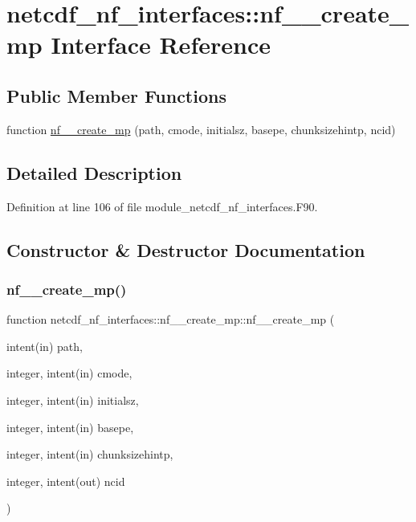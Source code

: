 \hypertarget{interfacenetcdf__nf__interfaces_1_1nf____create__mp}{}\section{netcdf\+\_\+nf\+\_\+interfaces\+:\+:nf\+\_\+\+\_\+create\+\_\+mp Interface Reference}
\label{interfacenetcdf__nf__interfaces_1_1nf____create__mp}
\subsection*{Public Member Functions}
\begin{DoxyCompactItemize}
\item 
function \hyperlink{interfacenetcdf__nf__interfaces_1_1nf____create__mp_a25732f5bf5d4bcc2d595ef15f154d329}{nf\+\_\+\+\_\+create\+\_\+mp} (path, cmode, initialsz, basepe, chunksizehintp, ncid)
\end{DoxyCompactItemize}


\subsection{Detailed Description}


Definition at line 106 of file module\+\_\+netcdf\+\_\+nf\+\_\+interfaces.\+F90.



\subsection{Constructor \& Destructor Documentation}
\mbox{\label{interfacenetcdf__nf__interfaces_1_1nf____create__mp_a25732f5bf5d4bcc2d595ef15f154d329}} 
\subsubsection{\texorpdfstring{nf\+\_\+\+\_\+create\+\_\+mp()}{nf\_\_create\_mp()}}
{\footnotesize\ttfamily function netcdf\+\_\+nf\+\_\+interfaces\+::nf\+\_\+\+\_\+create\+\_\+mp\+::nf\+\_\+\+\_\+create\+\_\+mp (\begin{DoxyParamCaption}\item[{intent(in)}]{path,  }\item[{integer, intent(in)}]{cmode,  }\item[{integer, intent(in)}]{initialsz,  }\item[{integer, intent(in)}]{basepe,  }\item[{integer, intent(in)}]{chunksizehintp,  }\item[{integer, intent(out)}]{ncid }\end{DoxyParamCaption})}




